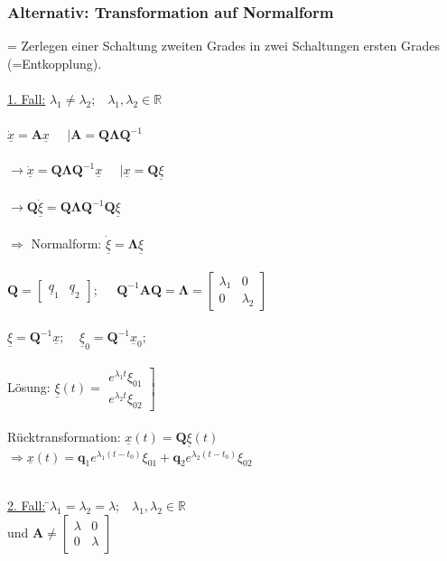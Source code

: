 \documentclass[a4paper,twocolumn,10pt]{article}
\begin{document}
\subsubsection*{Alternativ: Transformation auf Normalform}
= Zerlegen einer Schaltung zweiten Grades in zwei Schaltungen ersten Grades (=Entkopplung).\\\\
\underline{1. Fall:} $\lambda_1 \ne \lambda_2;\;\;\;\lambda_1,\lambda_2\in \mathbb{R}$\\\\
$\underline{\dot{x}}=\textbf{A}\underline{x}\;\;\;\;\;|\textbf{A}=\textbf{Q}\mathbf{\Lambda} \textbf{Q}^{-1}$\\\\
$\rightarrow\underline{\dot{x}}=\textbf{Q}\mathbf{\Lambda} \textbf{Q}^{-1}\underline{x}\;\;\;\;\;|\underline{x}=\textbf{Q}\underline{\xi}$\\\\
$\rightarrow\textbf{Q}\underline{\dot\xi}=\textbf{Q}\mathbf{\Lambda} \textbf{Q}^{-1}\textbf{Q}\underline{\xi}$\\\\
$\Rightarrow$ Normalform: $\underline{\dot{\xi}}= \mathbf{\Lambda} \underline{\xi}$\\\\
$\textbf{Q}=\begin{bmatrix}\underline{q}_1 & \underline{q}_2\end{bmatrix};\;\;\;\;\;\textbf{Q}^{-1}\textbf{A}\textbf{Q}=\mathbf{\Lambda} =\begin{bmatrix}\lambda_1 & 0 \\ 0 & \lambda_2\end{bmatrix}$\\\\
$\underline{\xi}=\textbf{Q}^{-1}\underline{x};\;\;\;\;\underline{\xi}_0=\textbf{Q}^{-1}\underline{x}_0;\;\;\;\;$\\\\
Lösung: $\underline{\xi} (t)=\left.\begin{matrix}e^{\lambda_1 t}\xi_{01} \\ e^{\lambda_2 t}\xi_{02}\end{matrix}\right]$\\\\
Rücktransformation: $\underline{x}(t)=\textbf{Q}\underline{\xi}(t)$\\
$\Rightarrow \underline{x}(t)= \textbf{q}_1 e^{\lambda_1 (t-t_0)} \xi_{01}+ \textbf{q}_2 e^{\lambda_2 (t-t_0)} \xi_{02} $
\begin{tabbing}\\
\underline{2. Fall:} \=$\lambda_1 = \lambda_2 =\lambda;\;\;\;\lambda_1,\lambda_2\in \mathbb{R}$\\
\> und $\textbf{A}\neq \begin{bmatrix}\lambda & 0 \\ 0 & \lambda\end{bmatrix}$
\end{tabbing}
\end{document}
